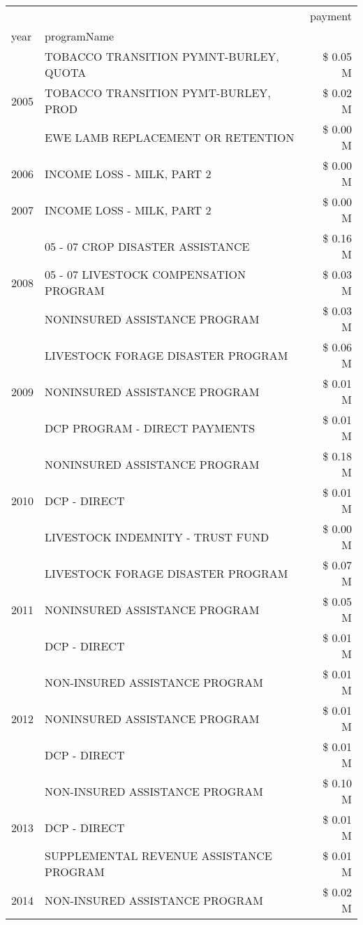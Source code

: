 \begin{tabular}{llr}
\toprule
 &  & payment \\
year & programName &  \\
\midrule
\multirow[t]{3}{*}{2005} & TOBACCO TRANSITION PYMNT-BURLEY, QUOTA & \$ 0.05 M \\
 & TOBACCO TRANSITION PYMT-BURLEY, PROD & \$ 0.02 M \\
 & EWE LAMB REPLACEMENT OR RETENTION & \$ 0.00 M \\
\cline{1-3}
2006 & INCOME LOSS - MILK, PART 2 & \$ 0.00 M \\
\cline{1-3}
2007 & INCOME LOSS - MILK, PART 2 & \$ 0.00 M \\
\cline{1-3}
\multirow[t]{3}{*}{2008} & 05 - 07 CROP DISASTER ASSISTANCE & \$ 0.16 M \\
 & 05 - 07 LIVESTOCK COMPENSATION PROGRAM & \$ 0.03 M \\
 & NONINSURED ASSISTANCE PROGRAM & \$ 0.03 M \\
\cline{1-3}
\multirow[t]{3}{*}{2009} & LIVESTOCK FORAGE DISASTER  PROGRAM & \$ 0.06 M \\
 & NONINSURED ASSISTANCE PROGRAM & \$ 0.01 M \\
 & DCP PROGRAM - DIRECT PAYMENTS & \$ 0.01 M \\
\cline{1-3}
\multirow[t]{3}{*}{2010} & NONINSURED ASSISTANCE PROGRAM & \$ 0.18 M \\
 & DCP - DIRECT & \$ 0.01 M \\
 & LIVESTOCK INDEMNITY - TRUST FUND & \$ 0.00 M \\
\cline{1-3}
\multirow[t]{3}{*}{2011} & LIVESTOCK FORAGE DISASTER PROGRAM & \$ 0.07 M \\
 & NONINSURED ASSISTANCE PROGRAM & \$ 0.05 M \\
 & DCP - DIRECT & \$ 0.01 M \\
\cline{1-3}
\multirow[t]{3}{*}{2012} & NON-INSURED ASSISTANCE PROGRAM & \$ 0.01 M \\
 & NONINSURED ASSISTANCE PROGRAM & \$ 0.01 M \\
 & DCP - DIRECT & \$ 0.01 M \\
\cline{1-3}
\multirow[t]{3}{*}{2013} & NON-INSURED ASSISTANCE PROGRAM & \$ 0.10 M \\
 & DCP - DIRECT & \$ 0.01 M \\
 & SUPPLEMENTAL REVENUE ASSISTANCE PROGRAM & \$ 0.01 M \\
\cline{1-3}
\multirow[t]{3}{*}{2014} & NON-INSURED ASSISTANCE PROGRAM & \$ 0.02 M \\

\end{tabular}
